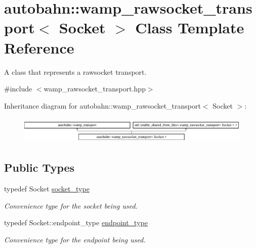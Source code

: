 \hypertarget{classautobahn_1_1wamp__rawsocket__transport}{}\section{autobahn\+:\+:wamp\+\_\+rawsocket\+\_\+transport$<$ Socket $>$ Class Template Reference}
\label{classautobahn_1_1wamp__rawsocket__transport}


A class that represents a rawsocket transport.  




{\ttfamily \#include $<$wamp\+\_\+rawsocket\+\_\+transport.\+hpp$>$}

Inheritance diagram for autobahn\+:\+:wamp\+\_\+rawsocket\+\_\+transport$<$ Socket $>$\+:\begin{figure}[H]
\begin{center}
\leavevmode
\includegraphics[height=1.323877cm]{classautobahn_1_1wamp__rawsocket__transport}
\end{center}
\end{figure}
\subsection*{Public Types}
\begin{DoxyCompactItemize}
\item 
typedef Socket \hyperlink{classautobahn_1_1wamp__rawsocket__transport_aa11aea0af1d26f4ead1cfb07f877034b}{socket\+\_\+type}\hypertarget{classautobahn_1_1wamp__rawsocket__transport_aa11aea0af1d26f4ead1cfb07f877034b}{}\label{classautobahn_1_1wamp__rawsocket__transport_aa11aea0af1d26f4ead1cfb07f877034b}

\begin{DoxyCompactList}\small\item\em Convenience type for the socket being used. \end{DoxyCompactList}\item 
typedef Socket\+::endpoint\+\_\+type \hyperlink{classautobahn_1_1wamp__rawsocket__transport_ae262d9ecdd93daae0e44b5b557bf24e8}{endpoint\+\_\+type}\hypertarget{classautobahn_1_1wamp__rawsocket__transport_ae262d9ecdd93daae0e44b5b557bf24e8}{}\label{classautobahn_1_1wamp__rawsocket__transport_ae262d9ecdd93daae0e44b5b557bf24e8}

\begin{DoxyCompactList}\small\item\em Convenience type for the endpoint being used. \end{DoxyCompactList}\end{DoxyCompactItemize}
